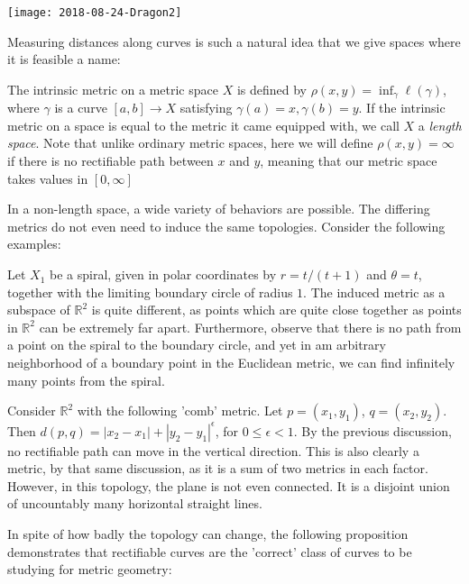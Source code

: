 \documentclass[12pt]{amsart}
\begin{document}
\begin{center}
  \texttt{[image: 2018-08-24-Dragon2]}
\end{center}

Measuring distances along curves is such a natural idea that we give spaces where it is feasible a name:

\begin{definition}
The intrinsic metric on a metric space $X$ is defined by $\rho(x,y) = \inf_\gamma \ell(\gamma)$, where $\gamma$ is a curve $[a,b] \to X$ satisfying $\gamma(a) = x, \gamma(b) = y$.  If the intrinsic metric on a space is equal to the metric it came equipped with, we call $X$ a \textit{length space}. Note that unlike ordinary metric spaces, here we will define $\rho(x,y) = \infty$ if there is no rectifiable path between $x$ and $y$, meaning that our metric space takes values in $[ 0, \infty ]$
\end{definition}

In a non-length space, a wide variety of behaviors are possible. The differing metrics do not even need to induce the same topologies. Consider the following examples:

\begin{example}
Let $X_1$ be a spiral, given in polar coordinates by $r = t/(t+1)$ and $\theta = t$, together with the limiting boundary circle of radius $1$. The induced metric as a subspace of $\mathbb{R}^2$ is quite different, as points which are quite close together as points in $\mathbb{R}^2$ can be extremely far apart. Furthermore, observe that there is no path from a point on the spiral to the boundary circle, and yet in am arbitrary neighborhood of a boundary point in the Euclidean metric, we can find infinitely many points from the spiral.
\end{example}

\begin{example}
Consider $\mathbb{R}^2$ with the following 'comb' metric. Let $p = (x_1, y_1)$, $q = (x_2, y_2)$. Then $d(p,q)= |x_2 - x_1| + |y_2 - y_1|^\epsilon$, for $0 \leq \epsilon < 1$. By the previous discussion, no rectifiable path can move in the vertical direction. This is also clearly a metric, by that same discussion, as it is a sum of two metrics in each factor. However, in this topology, the plane is not even connected. It is a disjoint union of uncountably many horizontal straight lines. 
\end{example}

In spite of how badly the topology can change, the following proposition demonstrates that rectifiable curves are the 'correct' class of curves to be studying for metric geometry:
\end{document}
